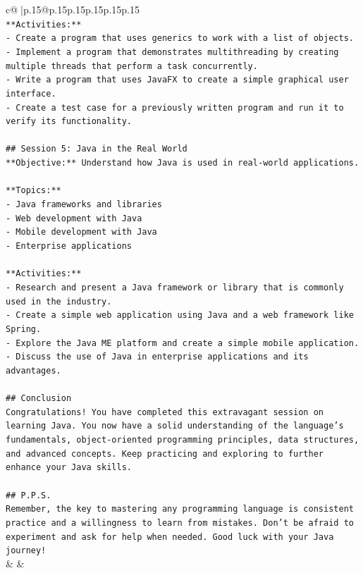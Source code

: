 \documentclass{article}
\begin{document}
{\begin{supertabular}{c@{$\;$}|p{.15\linewidth}@{}p{.15\linewidth}p{.15\linewidth}p{.15\linewidth}p{.15\linewidth}p{.15\linewidth}}
{{{\\ 
\texttt{**Activities:**} \\
\texttt{{-} Create a program that uses generics to work with a list of objects.} \\
\texttt{{-} Implement a program that demonstrates multithreading by creating multiple threads that perform a task concurrently.} \\
\texttt{{-} Write a program that uses JavaFX to create a simple graphical user interface.} \\
\texttt{{-} Create a test case for a previously written program and run it to verify its functionality.} \\
\\ 
\texttt{\#\# Session 5: Java in the Real World} \\
\texttt{**Objective:** Understand how Java is used in real{-}world applications.} \\
\\ 
\texttt{**Topics:**} \\
\texttt{{-} Java frameworks and libraries} \\
\texttt{{-} Web development with Java} \\
\texttt{{-} Mobile development with Java} \\
\texttt{{-} Enterprise applications} \\
\\ 
\texttt{**Activities:**} \\
\texttt{{-} Research and present a Java framework or library that is commonly used in the industry.} \\
\texttt{{-} Create a simple web application using Java and a web framework like Spring.} \\
\texttt{{-} Explore the Java ME platform and create a simple mobile application.} \\
\texttt{{-} Discuss the use of Java in enterprise applications and its advantages.} \\
\\ 
\texttt{\#\# Conclusion} \\
\texttt{Congratulations! You have completed this extravagant session on learning Java. You now have a solid understanding of the language's fundamentals, object{-}oriented programming principles, data structures, and advanced concepts. Keep practicing and exploring to further enhance your Java skills.} \\
\\ 
\texttt{\#\# P.P.S.} \\
\texttt{Remember, the key to mastering any programming language is consistent practice and a willingness to learn from mistakes. Don't be afraid to experiment and ask for help when needed. Good luck with your Java journey!} \\
            }
        }
    }
    & & \\ \\


\end{supertabular}}
\end{document}
